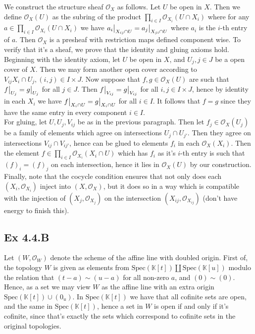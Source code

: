 \documentclass{article}
\newcommand\restr[2]{{%
  \left.\kern-\nulldelimiterspace %
  #1 %
  \vphantom{\big|} %
  \right|_{#2} %
  }}
\theoremstyle{definition}
\newcommand{\K}{\mathbb{K}}
\newcommand{\oo}{\mathcal{O}}
\newcommand{\Spec}{\text{Spec}}
\begin{document}
We construct the structure sheaf $\mathcal{O}_{X}$ as follows. Let $U$ be open
in $X$. Then we define $\oo_X(U)$ as the subring of the product $\prod_{i \in
I} \oo_{X_i}(U \cap X_i)$ where for any $a \in \prod_{i \in I} \oo_{X_i}(U \cap
X_i)$ we have $\restr{a_i}{X_{ij} \cap U} = \restr{a_j}{X_{ji} \cap U}$ where
$a_i$ is the $i$-th entry of $a$. Then $\mathcal{O}_X$ is a presheaf with
restriction maps defined component wise. To verify that it's a sheaf, we prove
that the identity and gluing axioms hold. \\

Beginning with the identity axiom, let $U$ be open in $X$, and $U_j, j \in J$
be a open cover of $X$. Then we may form another open cover according to
$V_{ij} X_i \cap U_j, (i, j) \in I \times J$. Now suppose that $f, g \in
\mathcal{O}_{X}(U)$ are such that $\restr{f}{U_j} = \restr{g}{U_j}$ for all $j
\in J$. Then $\restr{f}{V_{ij}} = \restr{g}{V_{ij}}$ for all $i,j \in I \times
J$, hence by identity in each $X_i$ we have $\restr{f}{X_i \cap U} =
\restr{g}{X_i \cap U}$ for all $i \in I$. It follows that $f = g$ since they
have the same entry in every component $i \in I$. \\

For gluing, let $U, U_j, V_{ij}$ be as in the previous paragraph. Then let $f_j
\in \mathcal{O}_X(U_j)$ be a family of elements which agree on intersections
$U_j \cap U_{j'}$. Then they agree on intersections $V_{ij} \cap V_{ij'}$,
hence can be glued to elements $f_i$ in each $\mathcal{O}_X(X_i)$. Then the
element $f \in \prod_{i \in I} \oo_{X_i}(X_i \cap U)$ which has $f_i$ as it's
$i$-th entry is such that $(f)_i = (f)_j$ on each intersection, hence it lies
in $\mathcal{O}_{X}(U)$ by our construction. \\

Finally, note that the cocycle condition ensures that not only does each $(X_i,
\oo_{X_i})$ inject into $(X, \oo_X)$, but it does so in a way which is
compatible with the injection of $(X_j, \oo_{X_j})$ on the intersection
$(X_{ij}, \oo_{X_{ij}})$ (don't have energy to finish this). 


\subsection*{Ex 4.4.B}

Let $(W, \oo_W)$ denote the scheme of the affine line with doubled origin.
First of, the topology $W$ is given as elements from $\Spec(\K[t]) \coprod
\Spec(\K[u])$ modulo the relation that $(t - a) \sim (u - a)$ for all non-zero
$a$, and $(0) \sim (0)$. Hence, as a set we may view $W$ as the affine line
with an extra origin $\Spec(\K[t]) \cup (0_u)$. In $\Spec(\K[t])$ we have that
all cofinite sets are open, and the same in $\Spec(\K[t])$, hence a set in $W$
is open if and only if it's cofinite, since that's exactly the sets which
correspond to cofinite sets in the original topologies. \\
\end{document}
